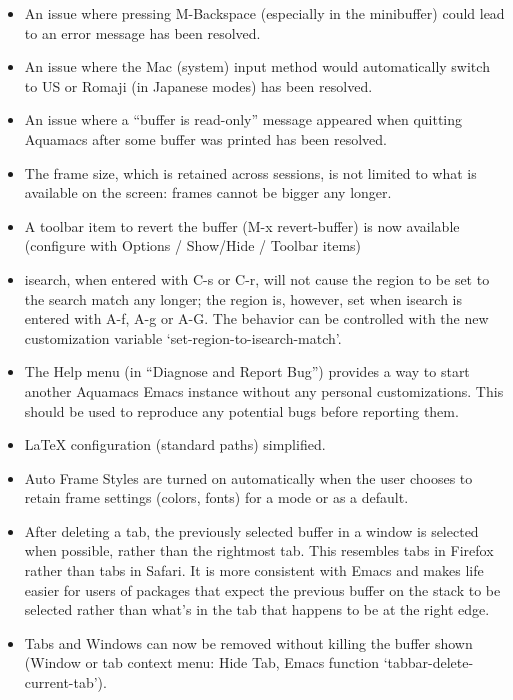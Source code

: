 \begin{itemize}
\item An issue where pressing M-Backspace (especially in the minibuffer) could lead to an error message has been resolved.

\item An issue where the Mac (system) input method would automatically switch to US or Romaji (in Japanese modes) has been resolved.

\item An issue where a ``buffer is read-only'' message appeared when quitting Aquamacs after some buffer was printed has been resolved.

\item The frame size, which is retained across sessions, is not limited to what is available on the screen: frames cannot be bigger any longer.

\item A toolbar item to revert the buffer (M-x revert-buffer) is now available (configure with Options / Show/Hide / Toolbar items)

\item isearch, when entered with C-s or C-r, will not cause the region to be
set to the search match any longer; the region is, however, set when
isearch is entered with A-f, A-g or A-G.  The behavior can be
controlled with the new customization variable
`set-region-to-isearch-match'.


\item The Help menu (in ``Diagnose and Report Bug'') provides a way to start another Aquamacs Emacs instance without any personal customizations.  This should be used to reproduce any potential bugs before reporting them.

\item LaTeX configuration (standard paths) simplified.

\item Auto Frame Styles are turned on automatically when the user chooses to retain frame settings (colors, fonts) for a mode or as a default.

\item After deleting a tab, the previously selected buffer in a window is selected when possible, rather than the rightmost tab.  This resembles tabs in Firefox rather than tabs in Safari.  It is more consistent with Emacs and makes life easier for users of packages that expect the previous buffer on the stack to be selected rather than what's in the tab that happens to be at the right edge.

\item Tabs and Windows can now be removed without killing the buffer shown (Window or tab context menu: Hide Tab, Emacs function `tabbar-delete-current-tab').


\end{itemize}
